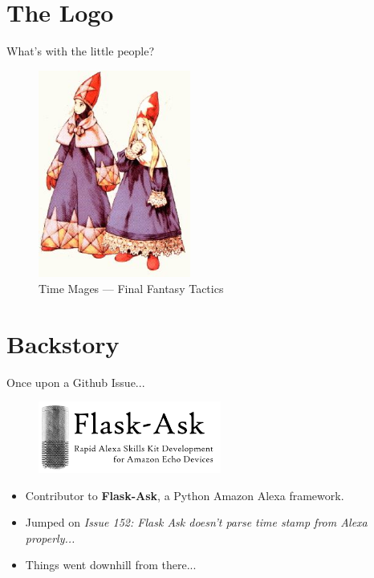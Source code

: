 \documentclass[10pt]{beamer}
\newif\ifplacelogo %
\begin{document}
\section{The Logo}
\begin{frame}{What's with the little people?}
	\begin{figure}
		\centering
		\includegraphics[width=5cm]{images/FFT_Time_Mage.jpg}
		\caption{Time Mages --- Final Fantasy Tactics}
	\end{figure}
\end{frame}

\placelogotrue

\section{Backstory}
\begin{frame}{Once upon a Github Issue...}
	\begin{figure}
		\centering
		\includegraphics[width=6cm]{images/flaskask.png}
	\end{figure}
\begin{itemize}
\item Contributor to \textbf{Flask-Ask}, a Python Amazon Alexa framework.
\item Jumped on \textit{Issue 152: Flask Ask doesn't parse time stamp from Alexa properly...}
\item Things went downhill from there...
\end{itemize}
\end{frame}
\end{document}
